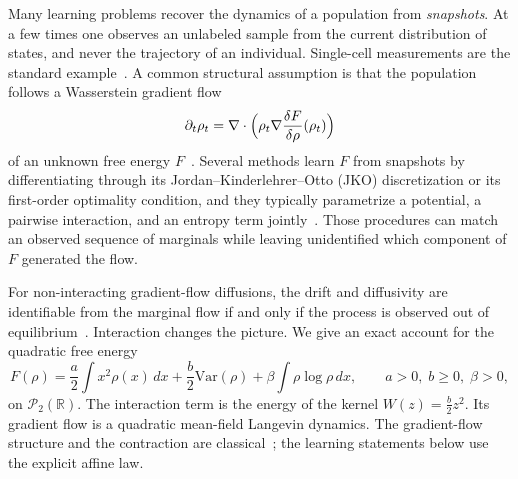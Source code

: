 \documentclass[anon,11pt]{alt2027}
\newcommand{\R}{\mathbb{R}}
\newcommand{\Ptwo}{\mathcal{P}_2}
\newcommand{\Var}{\mathrm{Var}}
\begin{document}
Many learning problems recover the dynamics of a population from
\emph{snapshots}. At a few times one observes an unlabeled sample from the
current distribution of states, and never the trajectory of an individual.
Single-cell measurements are the standard example~\cite{Schiebinger19}. A
common structural assumption is that the population follows a Wasserstein
gradient flow
\begin{equation}
\label{eq:gf}
\partial_t\rho_t
=
\nabla\cdot\Bigl(\rho_t\nabla\frac{\delta F}{\delta\rho}(\rho_t)\Bigr)
\end{equation}
of an unknown free energy $F$~\cite{JKO98,AGS08}. Several methods learn $F$
from snapshots by differentiating through its Jordan--Kinderlehrer--Otto (JKO)
discretization or its first-order optimality condition, and they typically
parametrize a potential, a pairwise interaction, and an entropy term
jointly~\cite{Bunne22,Terpin24}. Those procedures can match an observed
sequence of marginals while leaving unidentified which component of $F$
generated the flow.

For non-interacting gradient-flow diffusions, the drift and diffusivity are
identifiable from the marginal flow if and only if the process is observed out
of equilibrium~\cite{Guan26}. Interaction changes the picture. We give an exact
account for the quadratic free energy
\begin{equation}
\label{eq:F}
F(\rho)
=
\frac a2\int x^2\rho(x)\,dx
+
\frac b2\Var(\rho)
+
\beta\int\rho\log\rho\,dx,
\qquad a>0,\; b\ge 0,\; \beta>0,
\end{equation}
on $\Ptwo(\R)$. The interaction term is the energy of the kernel
$W(z)=\frac b2 z^2$. Its gradient flow is a quadratic mean-field Langevin
dynamics. The gradient-flow structure and the contraction are
classical~\cite{McCann97,Malrieu03,CarrilloMcCannVillani03,CarrilloMcCannVillani06};
the learning statements below use the explicit affine law.
\end{document}
